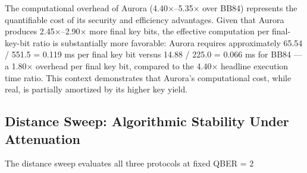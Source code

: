 {{{The computational overhead of Aurora (4.40×–5.35× over BB84) represents the quantifiable cost of its security and efficiency advantages. Given that Aurora produces 2.45×–2.90× more final key bits, the effective computation per final-key-bit ratio is substantially more favorable: Aurora requires approximately 65.54 / 551.5 = 0.119 ms per final key bit versus 14.88 / 225.0 = 0.066 ms for BB84 — a 1.80× overhead per final key bit, compared to the 4.40× headline execution time ratio. This context demonstrates that Aurora's computational cost, while real, is partially amortized by its higher key yield.

\subsection{Distance Sweep: Algorithmic Stability Under Attenuation}
The distance sweep evaluates all three protocols at fixed QBER = 2%

\captionof{table}{Distance sweep results at QBER = 2%
\begin{table}[hbt!]
\centering
\begin{tabular}{|c|c|c|c|c|}
\hline
\textbf{Distance (km)} & \textbf{BB84 Final (bits)} & \textbf{SARG04 Final (bits)} & \textbf{Aurora Final (bits)} & \textbf{Exec Time: Aurora (ms)} \\
\hline
5 & 224.4 ± 6.8 & 311.7 ± 7.9 & 551.7 ± 4.2 & 65.73 ± 3.11 \\
10 & 224.6 ± 7.0 & 311.1 ± 7.8 & 552.5 ± 4.0 & 65.38 ± 3.05 \\
20 & 223.7 ± 6.9 & 311.1 ± 7.8 & 552.7 ± 4.1 & 65.66 ± 3.18 \\
35 & 224.3 ± 6.8 & 310.5 ± 7.7 & 552.7 ± 4.1 & 68.83 ± 3.42 \\
50 & 224.4 ± 6.8 & 311.3 ± 7.8 & 552.4 ± 4.2 & 65.70 ± 3.09 \\
\hline
\end{tabular}
\end{table}

The final key length standard deviation across all five distances is 0.3 bits for BB84, 0.4 bits for SARG04, and 0.4 bits for Aurora — effectively zero variation. This extreme stability (coefficient of variation < 0.2%

}}}}
